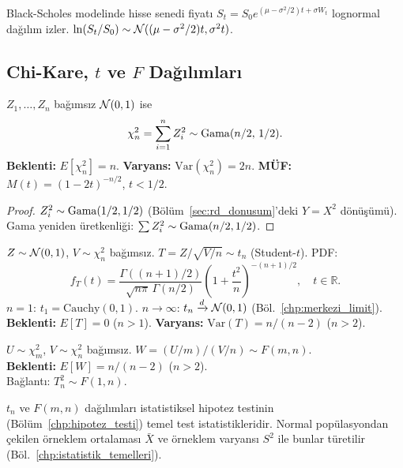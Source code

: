\begin{ornek}
Black-Scholes modelinde hisse senedi fiyatı $S_t = S_0 e^{(\mu-\sigma^2/2)t + \sigma W_t}$
lognormal dağılım izler. $\ln(S_t/S_0) \sim \mathcal{N}((\mu-\sigma^2/2)t, \sigma^2 t)$.
\end{ornek}

\subsection{Chi-Kare, \texorpdfstring{$t$}{t} ve \texorpdfstring{$F$}{F} Dağılımları}
\label{subsec:chi_t_f}

\begin{tanim}
\label{def:chi_kare}
$Z_1, \ldots, Z_n$ bağımsız $\mathcal{N}(0,1)$ ise
\[
  \chi^2_n = \sum_{i=1}^n Z_i^2 \sim \operatorname{Gama}(n/2,\, 1/2).
\]
\textbf{Beklenti:} $E[\chi^2_n] = n$. \quad
\textbf{Varyans:} $\mathrm{Var}(\chi^2_n) = 2n$. \quad
\textbf{MÜF:} $M(t) = (1-2t)^{-n/2}$, $t < 1/2$.
\end{tanim}

\begin{proof}
$Z_i^2 \sim \operatorname{Gama}(1/2, 1/2)$ (Bölüm~\ref{sec:rd_donusum}'deki $Y=X^2$ dönüşümü).
Gama yeniden üretkenliği: $\sum Z_i^2 \sim \operatorname{Gama}(n/2, 1/2)$.
\end{proof}

\begin{tanim}
\label{def:t_dagilim}
$Z \sim \mathcal{N}(0,1)$, $V \sim \chi^2_n$ bağımsız. $T = Z/\sqrt{V/n} \sim t_n$ (Student-$t$).
PDF:
\[
  f_T(t) = \frac{\Gamma((n+1)/2)}{\sqrt{n\pi}\,\Gamma(n/2)}\left(1+\frac{t^2}{n}\right)^{-(n+1)/2}, \quad t \in \mathbb{R}.
\]
$n = 1$: $t_1 = \mathrm{Cauchy}(0,1)$.
$n \to \infty$: $t_n \xrightarrow{d} \mathcal{N}(0,1)$ (Böl.~\ref{chp:merkezi_limit}).\\
\textbf{Beklenti:} $E[T] = 0$ ($n > 1$). \quad \textbf{Varyans:} $\mathrm{Var}(T) = n/(n-2)$ ($n > 2$).
\end{tanim}

\begin{tanim}[$F$ Dağılımı]
\label{def:f_dagilim}
$U \sim \chi^2_m$, $V \sim \chi^2_n$ bağımsız.
$W = (U/m)/(V/n) \sim F(m, n)$.\\
\textbf{Beklenti:} $E[W] = n/(n-2)$ ($n > 2$).\\
Bağlantı: $T_n^2 \sim F(1, n)$.
\end{tanim}

\begin{hocanotu}
$t_n$ ve $F(m,n)$ dağılımları istatistiksel hipotez testinin (Bölüm~\ref{chp:hipotez_testi})
temel test istatistikleridir. Normal popülasyondan çekilen örneklem ortalaması
$\bar{X}$ ve örneklem varyansı $S^2$ ile bunlar türetilir (Böl.~\ref{chp:istatistik_temelleri}).
\end{hocanotu}

